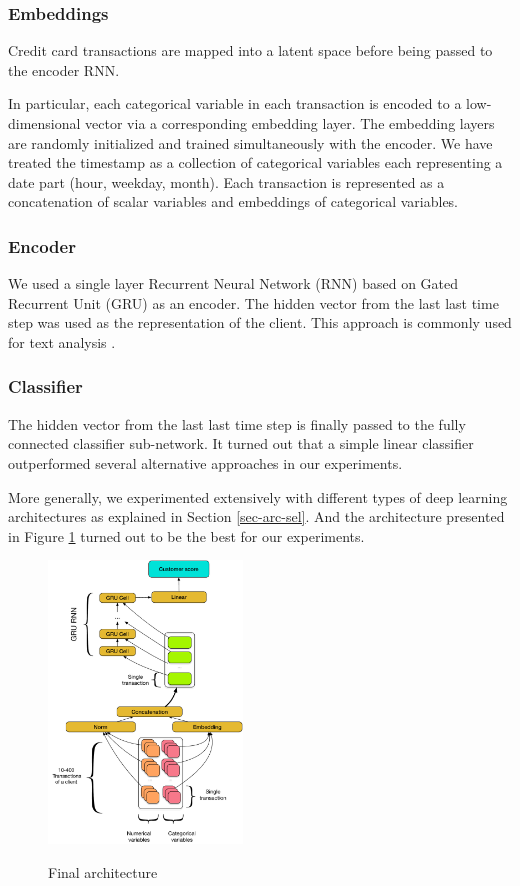 \documentclass[sigconf]{acmart}
\begin{document}
\subsubsection{Embeddings}

Credit card transactions are mapped into a latent space before being passed to the encoder RNN.

In particular, each categorical variable in each transaction is encoded to a low-dimensional vector via a corresponding embedding layer. The embedding layers are randomly initialized and trained simultaneously with the encoder. We have treated the timestamp as a collection of categorical variables each representing a date part (hour, weekday, month). Each transaction is represented as a concatenation of scalar variables and embeddings of categorical variables.

\subsubsection{Encoder}

We used a single layer Recurrent Neural Network (RNN) based on Gated Recurrent Unit (GRU)\cite{DBLP:journals/corr/ChoMGBSB14} as an encoder.  The hidden vector from the last last time step was used as the representation of the client. This approach is commonly used for text analysis \cite{NIPS2014_5346}.

\subsubsection{Classifier}

The hidden vector from the last last time step is finally passed to the fully connected classifier sub-network.
It turned out that a simple linear classifier outperformed several alternative approaches in our experiments.

More generally, we experimented extensively with different types of deep learning architectures as explained in Section \ref{sec-arc-sel}. And the architecture presented in Figure \ref{fig-arch} turned out to be the best for our experiments.


\begin{figure}[ht]
  \caption{Final architecture}
  \includegraphics[width=0.46\textwidth]{architecture.pdf}
  \label{fig-arch}
\end{figure}
\end{document}
